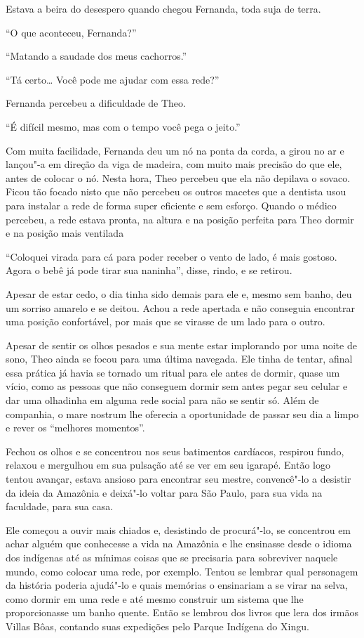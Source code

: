 Estava a beira do desespero quando chegou Fernanda, toda suja de terra.

``O que aconteceu, Fernanda?''

``Matando a saudade dos meus cachorros.''

``Tá certo\ldots{} Você pode me ajudar com essa rede?''

Fernanda percebeu a dificuldade de Theo.

``É difícil mesmo, mas com o tempo você pega o jeito.''

Com muita facilidade, Fernanda deu um nó na ponta da corda, a girou
no ar e lançou"-a em direção da viga de madeira, com muito mais precisão
do que ele, antes de colocar o nó. Nesta hora, Theo percebeu
que ela não depilava o sovaco. Ficou tão focado nisto que não
percebeu os outros macetes que a dentista usou para instalar a rede
de forma super eficiente e sem esforço. Quando o médico percebeu, a rede
estava pronta, na altura e na posição perfeita para Theo dormir e na
posição mais ventilada

``Coloquei virada para cá para poder receber o vento de lado, é mais
gostoso. Agora o bebê já pode tirar sua naninha'', disse, rindo, e se
retirou.

Apesar de estar cedo, o dia tinha sido demais para ele e, mesmo sem
banho, deu um sorriso amarelo e se deitou. Achou a rede apertada e não
conseguia encontrar uma posição confortável, por mais que se virasse de
um lado para o outro.

Apesar de sentir os olhos pesados e sua mente estar implorando por uma
noite de sono, Theo ainda se focou para uma última navegada. Ele tinha
de tentar, afinal essa prática já havia se tornado um ritual para ele
antes de dormir, quase um vício, como as pessoas que
não conseguem dormir sem antes pegar seu celular e dar uma olhadinha em
alguma rede social para não se sentir só. Além de companhia, o mare
nostrum lhe oferecia a oportunidade de passar seu dia a limpo e rever os
``melhores momentos''.

Fechou os olhos e se concentrou nos seus batimentos cardíacos, respirou
fundo, relaxou e mergulhou em sua pulsação até se ver em seu igarapé.
Então logo tentou avançar, estava ansioso para encontrar seu mestre,
convencê"-lo a desistir da ideia da Amazônia e deixá"-lo voltar para São
Paulo, para sua vida na faculdade, para sua casa.

Ele começou a ouvir mais chiados e, desistindo de procurá"-lo, se
concentrou em achar alguém que conhecesse a vida na Amazônia e lhe
ensinasse desde o idioma dos indígenas até as mínimas coisas que se
precisaria para sobreviver naquele mundo, como colocar uma rede, por
exemplo. Tentou se lembrar qual personagem da história poderia ajudá"-lo
e quais memórias o ensinariam a se virar na selva, como dormir em uma
rede e até mesmo construir um sistema que lhe proporcionasse um banho
quente. Então se lembrou dos livros que lera dos irmãos Villas Bôas,
contando suas expedições pelo Parque Indígena do Xingu.

